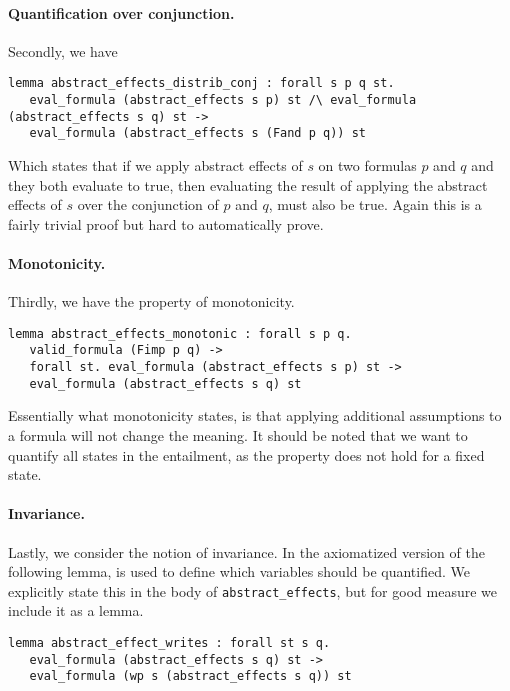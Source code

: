 \paragraph{Quantification over conjunction.}
Secondly, we have
\begin{lstlisting}
lemma abstract_effects_distrib_conj : forall s p q st.
   eval_formula (abstract_effects s p) st /\ eval_formula (abstract_effects s q) st ->
   eval_formula (abstract_effects s (Fand p q)) st
 \end{lstlisting}

Which states that if we apply abstract effects of $s$ on two formulas $p$ and $q$ and they both evaluate to true,
then evaluating the result of applying the abstract effects of $s$ over the conjunction of $p$ and $q$, must also be true. Again this is a fairly trivial proof but hard to automatically prove.

\paragraph{Monotonicity.}
Thirdly, we have the property of monotonicity.

\begin{lstlisting}
lemma abstract_effects_monotonic : forall s p q.
   valid_formula (Fimp p q) ->
   forall st. eval_formula (abstract_effects s p) st ->
   eval_formula (abstract_effects s q) st
 \end{lstlisting}

Essentially what monotonicity states, is that applying additional assumptions to a formula will not change the meaning. It should be noted that we want to quantify all states in the entailment, as the property does not hold for a fixed state.

\paragraph{Invariance.}
Lastly, we consider the notion of invariance.
In \cite{wp-revisited} the axiomatized version of the following lemma, is used to define which variables should be quantified.
We explicitly state this in the body of \texttt{abstract\_effects},
but for good measure we include it as a lemma.

\begin{lstlisting}
lemma abstract_effect_writes : forall st s q.
   eval_formula (abstract_effects s q) st ->
   eval_formula (wp s (abstract_effects s q)) st
 \end{lstlisting}

